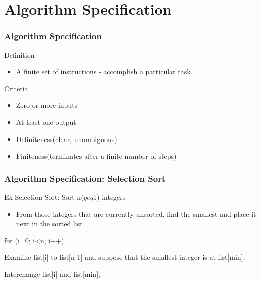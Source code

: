 \documentclass[newPxFont,sthlmFooter,nooffset]{beamer}
\begin{document}
\section{Algorithm Specification}
\begin{frame}[t]
  \frametitle{Algorithm Specification}
Definition
\begin{itemize}
\item A finite set of instructions - accomplish a particular task
\end{itemize}

Criteria
\begin{itemize}
\item Zero or more inputs 
\item At least one output
\item Definiteness(clear, unambiguous) 
\item Finiteness(terminates after a finite number of steps)
\end{itemize}

\end{frame}

\begin{frame}[t,fragile]
  \frametitle{Algorithm Specification: Selection Sort}
Ex Selection Sort: Sort n($geq$1) integers
\begin{itemize}
\item From those integers that are currently unsorted, find the smallest and place it next in the sorted list
\end{itemize}

\begin{codedef}
for (i=0; i<n; i++) {
    Examine list[i] to list[n-1] and suppose 
    that the smallest integer is at list[min];
  
    Interchange list[i] and list[min];
}
\end{codedef}

\end{frame}
\end{document}
